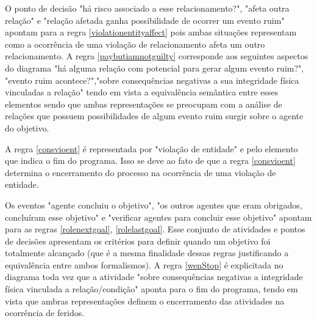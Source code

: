 O ponto de decisão "há risco associado a esse relacionamento?", "afeta  outra relação" e "relação afetada ganha possibilidade de ocorrer um evento ruim" apontam para a regra \ref{violationentityaffect} pois ambas situações representam como a ocorrência de uma violação de relacionamento afeta um outro relacionamento. A regra \ref{paybutiamnotguilty} corresponde aos seguintes aspectos do diagrama "há alguma relação com potencial para gerar algum evento ruim?", "evento ruim acontece?","sobre consequências negativas a sua integridade física vinculadas a relação" tendo em vista a equivalência semântica entre esses elementos sendo que ambas representações se preocupam com a análise de relações que possuem possibilidades de algum evento ruim surgir sobre o agente do objetivo. 

A regra \ref{consvioent} é representada por "violação de entidade" e pelo elemento que indica o fim do programa. Isso se deve ao fato de que a regra \ref{consvioent} determina o encerramento do processo na ocorrência de uma violação de entidade. 

Os eventos "agente concluiu o objetivo", "os outros agentes que eram obrigados, concluíram esse objetivo" e "verificar agentes para concluir esse objetivo" apontam para as regras \ref{rolenextgoal}, \ref{rolelastgoal}. Esse conjunto de atividades e pontos de decisões apresentam os critérios para definir quando um objetivo foi totalmente alcançado (que é a mesma finalidade dessas regras justificando a equivalência entre ambos formalismos).  A regra \ref{wenStop} é explicitada no diagrama toda vez que a atividade "sobre consequências negativas a integridade física vinculada  a relação/condição" aponta para o fim do programa, tendo em vista que ambras representações definem o encerramento das atividades na ocorrência de feridos. 

